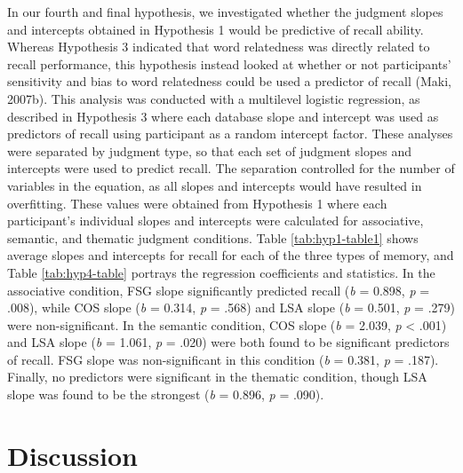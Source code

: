 \documentclass[english,man]{apa6}
\theoremstyle{definition}
\theoremstyle{definition}
\theoremstyle{definition}
\theoremstyle{remark}
\begin{document}
In our fourth and final hypothesis, we investigated whether the judgment
slopes and intercepts obtained in Hypothesis 1 would be predictive of
recall ability. Whereas Hypothesis 3 indicated that word relatedness was
directly related to recall performance, this hypothesis instead looked
at whether or not participants' sensitivity and bias to word relatedness
could be used a predictor of recall (Maki, 2007b). This analysis was
conducted with a multilevel logistic regression, as described in
Hypothesis 3 where each database slope and intercept was used as
predictors of recall using participant as a random intercept factor.
These analyses were separated by judgment type, so that each set of
judgment slopes and intercepts were used to predict recall. The
separation controlled for the number of variables in the equation, as
all slopes and intercepts would have resulted in overfitting. These
values were obtained from Hypothesis 1 where each participant's
individual slopes and intercepts were calculated for associative,
semantic, and thematic judgment conditions. Table \ref{tab:hyp1-table1}
shows average slopes and intercepts for recall for each of the three
types of memory, and Table \ref{tab:hyp4-table} portrays the regression
coefficients and statistics. In the associative condition, FSG slope
significantly predicted recall (\emph{b} = 0.898, \emph{p} = .008),
while COS slope (\emph{b} = 0.314, \emph{p} = .568) and LSA slope
(\emph{b} = 0.501, \emph{p} = .279) were non-significant. In the
semantic condition, COS slope (\emph{b} = 2.039, \emph{p} \textless{}
.001) and LSA slope (\emph{b} = 1.061, \emph{p} = .020) were both found
to be significant predictors of recall. FSG slope was non-significant in
this condition (\emph{b} = 0.381, \emph{p} = .187). Finally, no
predictors were significant in the thematic condition, though LSA slope
was found to be the strongest (\emph{b} = 0.896, \emph{p} = .090).

\section{Discussion}\label{discussion}
\end{document}
